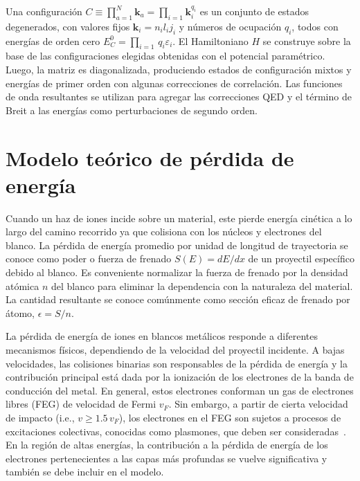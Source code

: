 Una configuración 
$C\equiv\prod_{a=1}^N\mathbf{k}_a=\prod_{i=1}\mathbf{k}_i^{q_i}$ es un 
conjunto de estados degenerados, con valores fijos 
$\mathbf{k}_i=n_il_ij_i$
y números de ocupación $q_i$, todos con energías de orden cero 
$E_C^0=\prod_{i=1}\,q_i\varepsilon_i$. 
El Hamiltoniano $H$ se construye sobre la base de las configuraciones 
elegidas obtenidas con el potencial paramétrico. Luego, la matriz es 
diagonalizada, produciendo estados de configuración mixtos y energías 
de primer orden con algunas correcciones de correlación. Las funciones 
de onda resultantes se utilizan para agregar las correcciones QED y el 
término de Breit a las energías como perturbaciones de segundo orden.

\section{Modelo teórico de pérdida de energía}
\label{sec:method-stopping}

Cuando un haz de iones incide sobre un material, este pierde energía 
cinética a lo largo del camino recorrido ya que colisiona con los 
núcleos y electrones del blanco. La pérdida de energía promedio 
por unidad de longitud de trayectoria se conoce como poder o fuerza de 
frenado $S(E)=dE/dx$ de un proyectil específico debido al blanco. Es 
conveniente normalizar la fuerza de frenado por la densidad atómica 
$n$ del blanco para eliminar la dependencia con la naturaleza del 
material. La cantidad resultante se conoce comúnmente como sección 
eficaz de frenado por átomo, $\epsilon=S/n$. 

La pérdida de energía de iones en blancos metálicos responde a 
diferentes mecanismos físicos, dependiendo de la velocidad del proyectil 
incidente. A bajas velocidades, las colisiones binarias son responsables 
de la pérdida de energía y la contribución principal está dada por la 
ionización de los electrones de la banda de conducción del metal. En 
general, estos electrones conforman un gas de electrones libres (FEG) 
de velocidad de Fermi $v_F$. Sin embargo, a partir de cierta velocidad 
de impacto (i.e., $v\geq 1.5\,v_F$), los electrones en el FEG son 
sujetos a procesos de excitaciones colectivas, conocidas como plasmones, 
que deben ser consideradas~\cite{Montanari:17}. En la región de altas 
energías, la contribución a la pérdida de energía de los electrones 
pertenecientes a las capas más profundas se vuelve significativa y 
también se debe incluir en el modelo.

